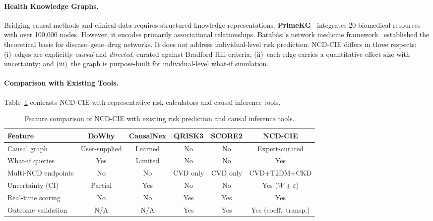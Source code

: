 \documentclass[runningheads]{llncs}
\begin{document}
\paragraph{Health Knowledge Graphs.}
Bridging causal methods and clinical data requires structured
knowledge representations.
\textbf{PrimeKG}~\cite{chandak2023primekg} integrates 20 biomedical
resources with over 100{,}000 nodes.
However, it encodes primarily associational relationships.
Barab\'{a}si's network medicine
framework~\cite{barabasi2011network} established the theoretical
basis for disease--gene--drug networks.
It does not address individual-level risk prediction.
NCD-CIE differs in three respects:
(i)~edges are explicitly \emph{causal} and \emph{directed}, curated
against Bradford Hill criteria;
(ii)~each edge carries a quantitative effect size with uncertainty;
and (iii)~the graph is purpose-built for individual-level what-if
simulation.

\paragraph{Comparison with Existing Tools.}
Table~\ref{tab:toolcomp} contrasts NCD-CIE with representative risk
calculators and causal inference tools.

\renewcommand{\arraystretch}{1.2}
\begin{table}[t]
\centering
\caption{Feature comparison of NCD-CIE with existing risk prediction
and causal inference tools.}\label{tab:toolcomp}
\small
\begin{tabular}{@{}lccccc@{}}
\toprule
\textbf{Feature} & \textbf{DoWhy} & \textbf{CausalNex} &
\textbf{QRISK3} & \textbf{SCORE2} & \textbf{NCD-CIE} \\
\midrule
Causal graph        & User-supplied & Learned & No  & No  & Expert-curated \\
What-if queries     & Yes & Limited & No  & No  & Yes \\
Multi-NCD endpoints & No  & No      & CVD only & CVD only & CVD+T2DM+CKD \\
Uncertainty (CI)    & Partial & Yes & No  & No  & Yes ($W\!\pm\!\varepsilon$) \\
Real-time scoring   & No  & No      & Yes & Yes & Yes \\
Outcome validation & N/A & N/A     & Yes & Yes & Yes (coeff.\ transp.) \\
\bottomrule
\end{tabular}
\end{table}
\renewcommand{\arraystretch}{1.0}
\end{document}
